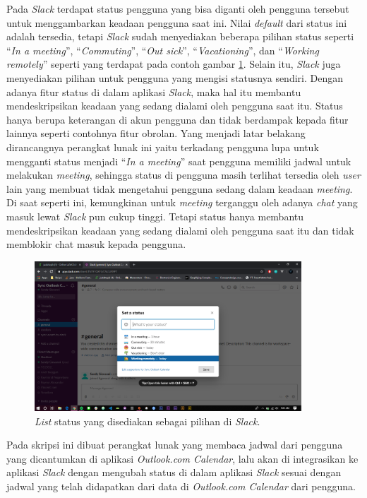 Pada \textit{Slack} terdapat status pengguna yang bisa diganti oleh pengguna tersebut untuk menggambarkan keadaan pengguna saat ini. Nilai \textit{default} dari status ini adalah tersedia, tetapi \textit{Slack} sudah menyediakan beberapa pilihan status seperti ``\textit{In a meeting}'', ``\textit{Commuting}'', ``\textit{Out sick}'', ``\textit{Vacationing}'', dan ``\textit{Working remotely}'' seperti yang terdapat pada contoh gambar \ref{fig:status_list_slack}. Selain itu, \textit{Slack} juga menyediakan pilihan untuk pengguna yang mengisi statusnya sendiri. Dengan adanya fitur status di dalam aplikasi \textit{Slack}, maka hal itu membantu mendeskripsikan keadaan yang sedang dialami oleh pengguna saat itu. Status hanya berupa keterangan di akun pengguna dan tidak berdampak kepada fitur lainnya seperti contohnya fitur obrolan. Yang menjadi latar belakang dirancangnya perangkat lunak ini yaitu terkadang pengguna lupa untuk mengganti status menjadi ``\textit{In a meeting}'' saat pengguna memiliki jadwal untuk melakukan \textit{meeting}, sehingga status di pengguna masih terlihat tersedia oleh \textit{user} lain yang membuat tidak mengetahui pengguna sedang dalam keadaan \textit{meeting}. Di saat seperti ini, kemungkinan untuk \textit{meeting} terganggu oleh adanya \textit{chat} yang masuk lewat \textit{Slack} pun cukup tinggi. Tetapi status hanya membantu mendeskripsikan keadaan yang sedang dialami oleh pengguna saat itu dan tidak memblokir chat masuk kepada pengguna. 

\begin{figure}[h]
  \includegraphics[width=10cm]{./Gambar/list_status.png}
  \centering
  \caption{\textit{List} status yang disediakan sebagai pilihan di \textit{Slack}.}
  \label{fig:status_list_slack}
\end{figure}

Pada skripsi ini dibuat perangkat lunak yang membaca jadwal dari pengguna yang dicantumkan di aplikasi \textit{Outlook.com Calendar}, lalu akan di integrasikan ke aplikasi \textit{Slack} dengan mengubah status di dalam aplikasi \textit{Slack} sesuai dengan jadwal yang telah didapatkan dari data di \textit{Outlook.com Calendar} dari pengguna. 

